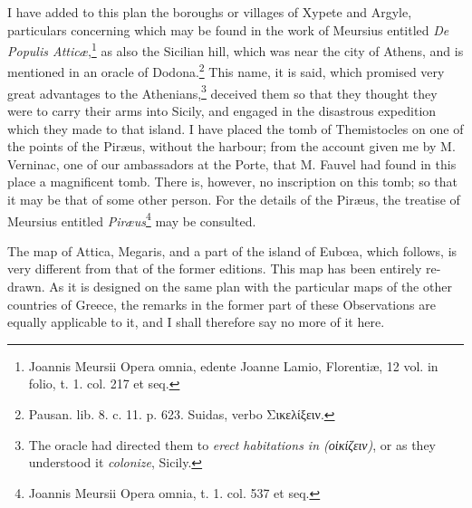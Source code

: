 \documentclass[a4paper, 11pt, oneside, polutonikogreek, english]{article}
\begin{document}
I have added to this plan the boroughs or villages of Xypete and Argyle, particulars concerning which may be found in the work of Meursius entitled \emph{De Populis Atticæ},\footnote{Joannis Meursii Opera omnia, edente Joanne Lamio, Florentiæ, 12 vol. in folio, t. 1. col. 217 et seq.} as also the Sicilian hill, which was near the city of Athens, and is mentioned in an oracle of Dodona.\footnote{Pausan. lib. 8. c. 11. p. 623. Suidas, verbo Σικελίξειν.} This name, it is said, which promised very great advantages to the Athenians,\footnote{The oracle had directed them to \emph{erect habitations in (οἱκίζειν)}, or as they understood it \emph{colonize}, Sicily.} deceived them so that they thought they were to carry their arms into Sicily, and engaged in the disastrous expedition which they made to that island. I have placed the tomb of Themistocles on one of the points of the Piræus, without the harbour; from the account given me by M. Verninac, one of our ambassadors at the Porte, that M. Fauvel had found in this place a magnificent tomb. There is, however, no inscription on this tomb; so that it may be that of some other person. For the details of the Piræus, the treatise of Meursius entitled \emph{Piræus}\footnote{Joannis Meursii Opera omnia, t. 1. col. 537 et seq.} may be consulted.

The map of Attica, Megaris, and a part of the island of Eubœa, which follows, is very different from that of the former editions. This map has been entirely re-drawn. As it is designed on the same plan with the particular maps of the other countries of Greece, the remarks in the former part of these Observations are equally applicable to it, and I shall therefore say no more of it here.
\end{document}

